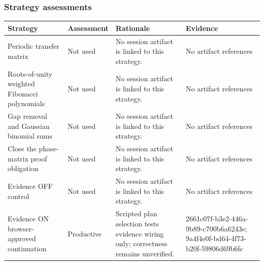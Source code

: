 \documentclass[11pt]{article}
\begin{document}
\subsubsection*{Strategy assessments}
\begin{longtable}{>{\raggedright\arraybackslash}p{.16\linewidth}>{\raggedright\arraybackslash}p{.15\linewidth}>{\raggedright\arraybackslash}p{.40\linewidth}>{\raggedright\arraybackslash}p{.17\linewidth}}
\toprule Strategy & Assessment & Rationale & Evidence \\
\midrule\endhead
Periodic transfer matrix & Not used & No session artifact is linked to this strategy. & No artifact references \\
Roots-of-unity weighted Fibonacci polynomials & Not used & No session artifact is linked to this strategy. & No artifact references \\
Gap removal and Gaussian binomial sums & Not used & No session artifact is linked to this strategy. & No artifact references \\
Close the phase-matrix proof obligation & Not used & No session artifact is linked to this strategy. & No artifact references \\
Evidence OFF control & Not used & No session artifact is linked to this strategy. & No artifact references \\
Evidence ON browser-approved continuation & Productive & Scripted plan selection tests evidence wiring only; correctness remains unverified. & 2661c07f-b3e2-446a-9b89-c700b6a6243e; 9a4f4e0f-bd64-4f73-b20f-59806d69b6fc \\
\bottomrule
\end{longtable}
\end{document}
